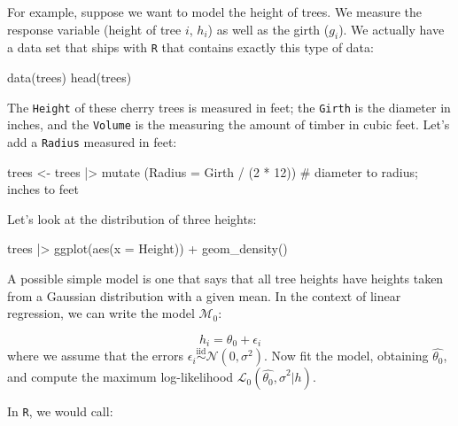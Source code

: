 \documentclass[
  letterpaper,
  DIV=11,
  numbers=noendperiod]{scrreprt}
\newenvironment{Shaded}{\begin{snugshade}}{\end{snugshade}}
\newcommand{\NormalTok}[1]{\textcolor[rgb]{0.00,0.23,0.31}{#1}}
\begin{document}
For example, suppose we want to model the height of trees. We measure
the response variable (height of tree \(i\), \(h_i\)) as well as the
girth (\(g_i\)). We actually have a data set that ships with \texttt{R}
that contains exactly this type of data:

\begin{Shaded}
\begin{Highlighting}[]
\NormalTok{data(trees)}
\NormalTok{head(trees)}
\end{Highlighting}
\end{Shaded}

The \texttt{Height} of these cherry trees is measured in feet; the
\texttt{Girth} is the diameter in inches, and the \texttt{Volume} is the
measuring the amount of timber in cubic feet. Let's add a
\texttt{Radius} measured in feet:

\begin{Shaded}
\begin{Highlighting}[]
\NormalTok{trees \textless{}{-} trees |\textgreater{} mutate (Radius = Girth / (2 * 12)) \# diameter to radius; inches to feet}
\end{Highlighting}
\end{Shaded}

Let's look at the distribution of three heights:

\begin{Shaded}
\begin{Highlighting}[]
\NormalTok{trees |\textgreater{} ggplot(aes(x = Height)) + geom\_density()}
\end{Highlighting}
\end{Shaded}

A possible simple model is one that says that all tree heights have
heights taken from a Gaussian distribution with a given mean. In the
context of linear regression, we can write the model \(\mathcal M_0\):

\[
h_i = \theta_0 + \epsilon_i
\] where we assume that the errors
\(\epsilon_i \overset{\text{iid}}{\sim} \mathcal N(0, \sigma^2)\). Now
fit the model, obtaining \(\hat{\theta_0}\), and compute the maximum
log-likelihood \(\mathcal L_0(\hat{\theta_0}, \hat{\sigma}^2 \vert h)\).

In \texttt{R}, we would call:

\begin{Shaded}
\end{Shaded}
\end{document}
